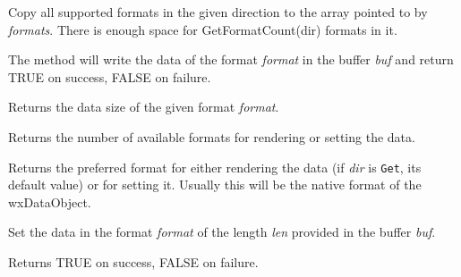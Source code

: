 \label{wxdataobjectgetallformats}


Copy all supported formats in the given direction to the array pointed to by 
{\it formats}. There is enough space for GetFormatCount(dir) formats in it.


\label{wxdataobjectgetdatahere}


The method will write the data of the format {\it format} in the buffer {\it
buf} and return TRUE on success, FALSE on failure.

\label{wxdataobjectgetdatasize}


Returns the data size of the given format {\it format}.

\label{wxdataobjectgetformatcount}


Returns the number of available formats for rendering or setting the data.

\label{wxdataobjectgetpreferredformat}


Returns the preferred format for either rendering the data (if {\it dir} is {\tt Get},
its default value) or for setting it. Usually this will be the
native format of the wxDataObject.

\label{wxdataobjectsetdata}


Set the data in the format {\it format} of the length {\it len} provided in the
buffer {\it buf}.

Returns TRUE on success, FALSE on failure.

